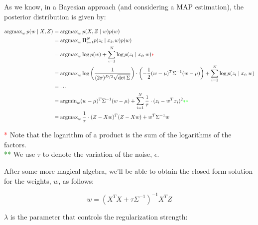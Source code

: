\documentclass[12pt]{article}
\begin{document}
\begin{enumerate}[leftmargin=\labelsep]
        As we know, in a Bayesian approach (and considering a MAP estimation), the posterior
        distribution is given by:

        \begin{align*}
          \operatorname{argmax}_w p(w \mid X, Z) & = \operatorname{argmax}_w p(X, Z \mid w) p(w)                                                 \\
                                                 & = \operatorname{argmax}_w \Pi_{i=1}^N p(z_i \mid x_i, w) p(w)                                 \\
                                                 & = \operatorname{argmax}_w \log p(w) + \sum_{i=1}^N \log p(z_i \mid x_i, w) \textcolor{red}{*} \\
                                                 & = \operatorname{argmax}_w \log{\left(\frac{1}{(2 \pi)^{D/2} \sqrt{\det{\Sigma}}}\right)}
          \cdot \left(- \frac{1}{2} (w - \mu)^T \Sigma^{-1} (w - \mu)\right)
          + \sum_{i=1}^N \log p(z_i \mid x_i, w)                                                                                                 \\
                                                 & = \cdots                                                                                      \\
                                                 & = \operatorname{argmin}_w (w - \mu)^T \Sigma^{-1} (w - \mu)
          + \sum_{i=1}^N \frac{1}{\tau} \cdot (z_i - w^T x_i)^2 \textcolor{green}{**}                                                            \\
                                                 & = \operatorname{argmax}_w \frac{1}{\tau} \cdot (Z - X w)^T (Z - X w) + w^T \Sigma^{-1} w
        \end{align*}

        \textcolor{red}{*} Note that the logarithm of a product is the sum of the logarithms of the factors. \\
        \textcolor{green}{**} We use $\tau$ to denote the variation of the noise, $\epsilon$.

        After some more magical algebra, we'll be able to obtain the closed form solution
        for the weights, $w$, as follows:

        $$
          w = (X^T X + \tau \Sigma^{-1})^{-1} X^T Z
        $$

        $\lambda$ is the parameter that controls the regularization strength:


\end{enumerate}
\end{document}

